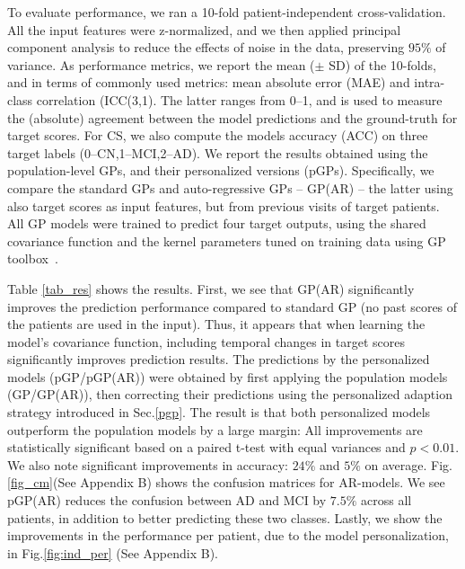 \documentclass{article}
\begin{document}
To evaluate performance, we ran a 10-fold patient-independent cross-validation. All the input features were z-normalized, and we then applied principal component analysis to reduce the effects of noise in the data, preserving $95\%$ of variance.
As performance metrics, we report the mean ($\pm$ SD) of the 10-folds, and in terms of commonly used metrics: mean absolute error (MAE) and intra-class correlation (ICC(3,1)\cite{shrout1979intraclass}. The latter ranges from 0--1, and is used to measure the (absolute) agreement between the model predictions and the ground-truth for target scores. For CS, we also compute the models accuracy (ACC) on three target labels (0--CN,1--MCI,2--AD). We report the results obtained using the population-level GPs, and their personalized versions (pGPs). Specifically, we compare the standard GPs and auto-regressive GPs -- GP(AR) -- the latter using also target scores as input features, but from previous visits of target patients. All GP models were trained to predict four target outputs, using the shared covariance function and the kernel parameters tuned on training data using GP toolbox~\cite{rasmussen2006gaussian}.

Table \ref{tab_res} shows the results. First, we see that GP(AR) significantly improves the prediction performance compared to standard GP (no past scores of the patients are used in the input). Thus, it appears that when learning the model's covariance function, including temporal changes in target scores significantly improves prediction results. The predictions by the personalized models (pGP/pGP(AR)) were obtained by first applying the population models (GP/GP(AR)), then correcting their predictions using the personalized adaption strategy introduced in Sec.\ref{pgp}. The result is that both personalized models outperform the population models by a large margin:  All improvements are statistically significant based on a paired t-test with equal variances and $p<0.01$. We also note significant improvements in accuracy: $24\%$ and $5\%$ on average. Fig.\ref{fig_cm}(See Appendix B) shows the confusion matrices for AR-models. We see pGP(AR) reduces the confusion between AD and MCI by $7.5\%$ across all patients, in addition to better predicting these two classes. Lastly, we show the improvements in the performance per patient, due to the model personalization, in Fig.\ref{fig:ind_per} (See Appendix B). 
\end{document}
